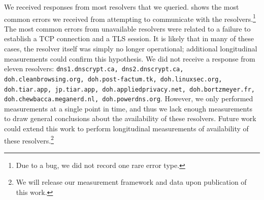 We received responses from most resolvers that we queried.  
shows the most common errors we received from attempting to communicate with
the resolvers.\footnote{Due to a bug, we did not record one rare error type.}
The most common errors from unavailable resolvers were related
to a failure to establish a TCP connection and a TLS session.  It is likely
that in many of these cases, the resolver itself was simply no longer
operational; additional longitudinal measurements could confirm this
hypothesis.  We did not receive a response from eleven resolvers:
\texttt{dns1.dnscrypt.ca, dns2.dnscrypt.ca, doh.cleanbrowsing.org,
doh.post-factum.tk, doh.linuxsec.org, doh.tiar.app, jp.tiar.app,
doh.appliedprivacy.net, doh.bortzmeyer.fr, doh.chewbacca.meganerd.nl,
doh.powerdns.org}. However, we only performed measurements at a single point
in time, and thus we lack enough measurements to draw general conclusions
about the availability of these resolvers. Future work could extend this work
to perform longitudinal measurements of availability of these
resolvers.\footnote{We will release our measurement framework and data upon
publication of this work.}


